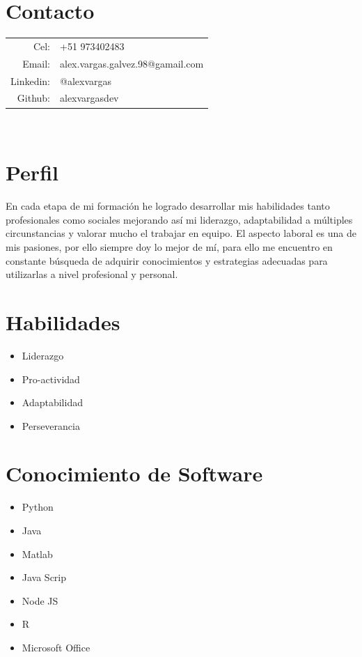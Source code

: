 \documentclass[11pt, oneside, a4paper, titlepage]{article}
\begin{document}
	\begin{tcolorbox}
		\begin{minipage}[t]{8cm}
			\vspace{-0.5cm}
			\begin{tcolorbox}[grow to left by=0.6cm, colback=gray!15, colframe=white]
				\section*{Contacto}
				\begin{tabular}{r l}
					Cel: & +51 973402483 \\
					Email: & alex.vargas.galvez.98@gamail.com\\
					Linkedin: & @alexvargas\\
					Github: & alexvargasdev 
				\end{tabular}
				\\
				\section*{Perfil}
				En cada etapa de mi formación he logrado desarrollar mis habilidades tanto profesionales como sociales mejorando así mi liderazgo, adaptabilidad a múltiples circunstancias y valorar mucho el trabajar en equipo. El aspecto laboral es una de mis pasiones, por ello siempre doy lo mejor de mí, para ello me encuentro en constante búsqueda de adquirir conocimientos y estrategias adecuadas para utilizarlas a nivel profesional y personal.
				
				\section*{Habilidades}
				
				\begin{itemize}
					\item Liderazgo
					\item Pro-actividad
					\item Adaptabilidad
					\item Perseverancia
				\end{itemize}
				
				\section*{Conocimiento de Software}
				
				\begin{itemize}
					\item Python
					\item Java
					\item Matlab
					\item Java Scrip
					\item Node JS
					\item R 
					\item Microsoft Office
					

\end{itemize}
\end{tcolorbox}
\end{minipage}
\end{tcolorbox}
\end{document}

